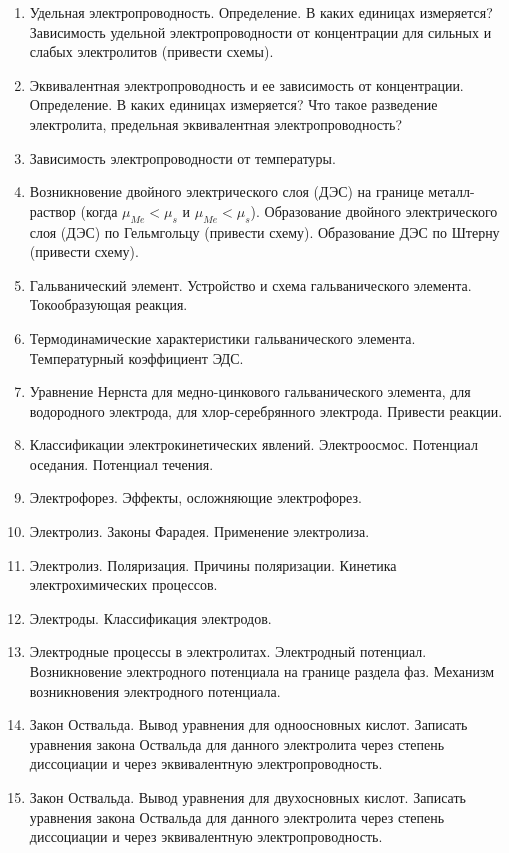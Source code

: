 \begin{enumerate}
\item
Удельная электропроводность. Определение. В каких единицах измеряется? Зависимость удельной электропроводности от концентрации для сильных и слабых электролитов (привести схемы).
 
\item
Эквивалентная электропроводность и ее зависимость от концентрации. Определение. В каких единицах измеряется? Что такое разведение электролита, предельная эквивалентная электропроводность?
 
\item
Зависимость электропроводности от температуры.
 
\item
Возникновение двойного электрического слоя (ДЭС) на границе металл-раствор (когда $\mu_{Me}<\mu_{s}$ и $\mu_{Me}<\mu_{s}$). Образование двойного электрического слоя (ДЭС) по Гельмгольцу (привести схему). Образование ДЭС по Штерну (привести схему).
 
\item
Гальванический элемент. Устройство и схема гальванического элемента. Токообразующая реакция. 
 
\item
Термодинамические характеристики гальванического элемента. Температурный коэффициент ЭДС.
 
\item
Уравнение Нернста для медно-цинкового гальванического элемента, для водородного электрода, для хлор-серебрянного электрода. Привести реакции.
 
\item
Классификации электрокинетических явлений. Электроосмос. Потенциал оседания. Потенциал течения.
 
\item
Электрофорез. Эффекты, осложняющие электрофорез. 
 
\item
Электролиз. Законы Фарадея. Применение электролиза.
 
\item
Электролиз. Поляризация. Причины поляризации. Кинетика электрохимических процессов.
 
\item
Электроды. Классификация электродов. 
 
\item
Электродные процессы в электролитах. Электродный потенциал. Возникновение электродного потенциала на границе раздела фаз. Механизм возникновения электродного потенциала.
 
\item
Закон Оствальда. Вывод уравнения для одноосновных кислот. Записать уравнения закона Оствальда для данного электролита через степень диссоциации и через эквивалентную электропроводность.
 
\item
Закон Оствальда. Вывод уравнения для двухосновных кислот. Записать уравнения закона Оствальда для данного электролита через степень диссоциации и через эквивалентную электропроводность.
\end{enumerate}